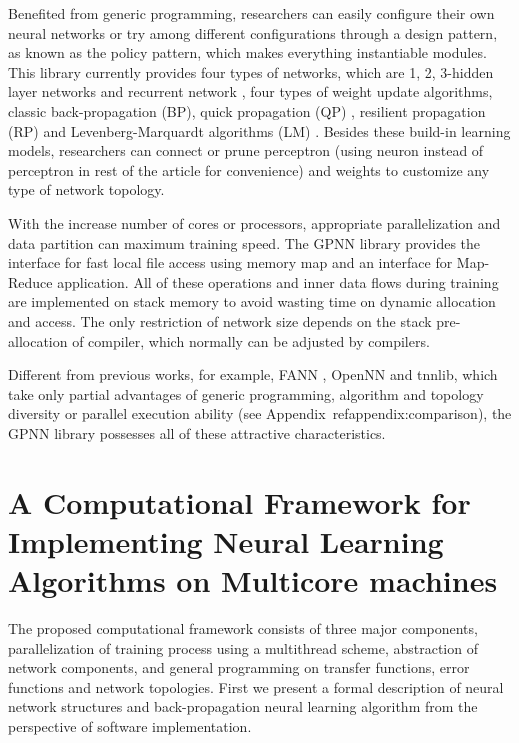 \documentclass[procedia]{easychair}
\begin{document}
Benefited from generic programming, researchers can easily configure their own neural networks or try among different configurations through a design pattern, as known as the policy pattern, which makes everything instantiable modules.  This library currently provides four types of networks, which are 1, 2, 3-hidden layer networks and recurrent network \cite{boden2001guide}, four types of weight update algorithms, classic back-propagation (BP), quick propagation (QP) \cite{fahlman1988empirical}, resilient propagation (RP) \cite{riedmiller1993direct} and Levenberg-Marquardt algorithms (LM) \cite{hagan1994training}.  Besides these build-in learning models, researchers can connect or prune perceptron (using neuron instead of perceptron in rest of the article for convenience) and weights to customize any type of network topology.

With the increase number of cores or processors, appropriate parallelization and data partition can maximum training speed.  The GPNN library provides the interface for fast local file access using memory map and an interface for Map-Reduce application.  All of these operations and inner data flows during training are implemented on stack memory to avoid wasting time on dynamic allocation and access.  The only restriction of network size depends on the stack pre-allocation of compiler, which normally can be adjusted by compilers.

Different from previous works, for example, FANN \cite{nissen2003implementation}, OpenNN \cite{lopezopennn} and tnnlib, which take only partial advantages of generic programming, algorithm and topology diversity or parallel execution ability (see Appendix~ref{appendix:comparison}), the GPNN library possesses all of these attractive characteristics.


\section{A Computational Framework for Implementing Neural Learning Algorithms on Multicore machines}

The proposed computational framework consists of three major components, parallelization of training process using a multithread scheme, abstraction of network components, and general programming on transfer functions, error functions and network topologies.  First we present a formal description of neural network structures and back-propagation neural learning algorithm from the perspective of software implementation.
\end{document}
